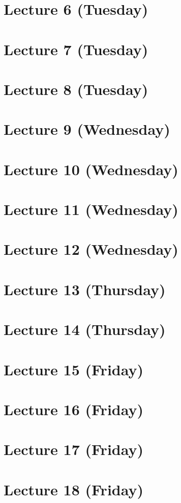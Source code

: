 \documentclass[12pt]{amsart}
\begin{document}
\section{Lecture 6 (Tuesday)}


\section{Lecture 7 (Tuesday)}


\section{Lecture 8 (Tuesday)}


\section{Lecture 9 (Wednesday)}


\section{Lecture 10 (Wednesday)}


\section{Lecture 11 (Wednesday)}


\section{Lecture 12 (Wednesday)}


\section{Lecture 13 (Thursday)}


\section{Lecture 14 (Thursday)}


\section{Lecture 15 (Friday)}
% 

\section{Lecture 16 (Friday)}
% 

\section{Lecture 17 (Friday)}
% 

\section{Lecture 18 (Friday)}
% 
\end{document}
